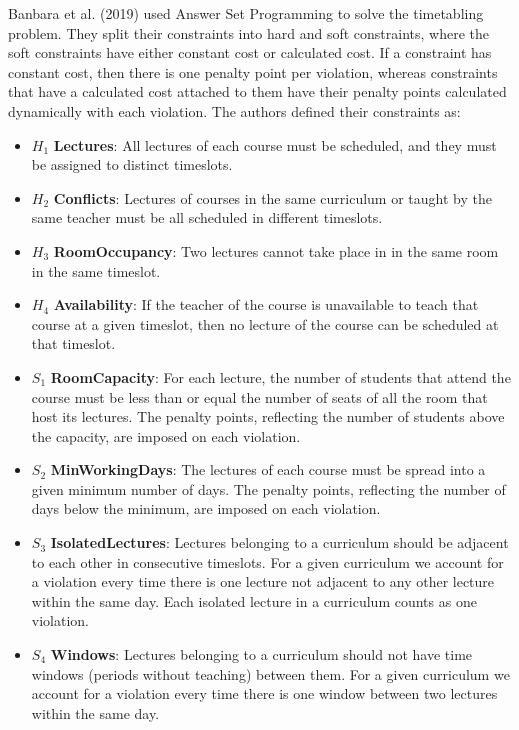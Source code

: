 \documentclass[a4paper, 12pt]{report}
\begin{document}
Banbara et al. (2019)\cite{asp_example} used Answer Set Programming to solve the 
timetabling problem.
They split their constraints into hard and soft constraints, where the soft
constraints have either constant cost or calculated cost.
If a constraint has constant cost, then there is one penalty point per
violation, whereas constraints that have a calculated cost attached to them
have their penalty points calculated dynamically with each violation.
The authors defined their constraints as:
\begin{itemize}
	\item \( H_1 \) \textbf{Lectures}: All lectures of each course must be 
		scheduled, and they must be assigned to distinct timeslots.
	\item \( H_2 \) \textbf{Conflicts}: Lectures of courses in the same 
		curriculum or taught by the same teacher must be all scheduled in 
		different timeslots.
	\item \( H_3 \) \textbf{RoomOccupancy}: Two lectures cannot take place in 
		in the same room in the same timeslot.
	\item \( H_4 \) \textbf{Availability}: If the teacher of the course is 
		unavailable to teach that course at a given timeslot, then no lecture of
		the course can be scheduled at that timeslot.
	\item \( S_1 \) \textbf{RoomCapacity}: For each lecture, the number of
		students that attend the course must be less than or equal the number of
		seats of all the room that host its lectures.
		The penalty points, reflecting the number of students above the
		capacity, are imposed on each violation.
	\item \( S_2 \) \textbf{MinWorkingDays}: The lectures of each course must be
		spread into a given minimum number of days.
		The penalty points, reflecting the number of days below the minimum, are
		imposed on each violation.
	\item \( S_3 \) \textbf{IsolatedLectures}: Lectures belonging to a
		curriculum should be adjacent to each other in consecutive timeslots.
		For a given curriculum we account for a violation every time there is 
		one lecture not adjacent to any other lecture within the same day.
		Each isolated lecture in a curriculum counts as one violation.
	\item \( S_4 \) \textbf{Windows}: Lectures belonging to a curriculum should 
		not have time windows (periods without teaching) between them.
		For a given curriculum we account for a violation every time there is
		one window between two lectures within the same day.

\end{itemize}
\end{document}
